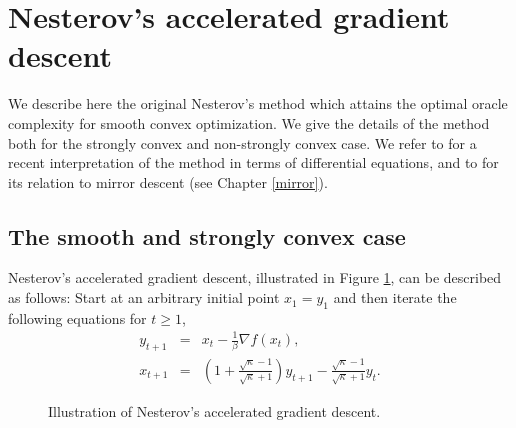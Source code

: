 \documentclass[openany]{now}
\begin{document}
\section{Nesterov's accelerated gradient descent} \label{sec:AGD}




We describe here the original Nesterov's method which attains the optimal oracle complexity for smooth convex optimization. We give the details of the method both for the strongly convex and non-strongly convex case. We refer to \cite{SBC14} for a recent interpretation of the method in terms of differential equations, and to \cite{AO14} for its relation to mirror descent (see Chapter \ref{mirror}).



\subsection{The smooth and strongly convex case}


Nesterov's accelerated gradient descent, illustrated in Figure \ref{fig:nesterovacc}, can be described as follows: Start at an arbitrary initial point 
$x_1 = y_1$ and then iterate the following equations for $t \geq 1$,
\begin{eqnarray*}
y_{t+1} & = & x_t  - \frac{1}{\beta} \nabla f(x_t) , \\
x_{t+1} & = & \left(1 + \frac{\sqrt{\kappa}-1}{\sqrt{\kappa}+1} \right) y_{t+1} - \frac{\sqrt{\kappa}-1}{\sqrt{\kappa}+1} y_t .
\end{eqnarray*}

\begin{figure}
\begin{center}
\end{center}
\caption{Illustration of Nesterov's accelerated gradient descent.}
\label{fig:nesterovacc}
\end{figure}
\end{document}
